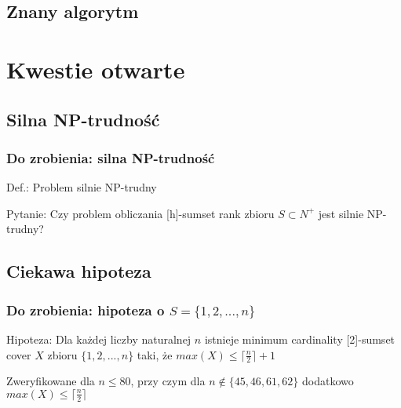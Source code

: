 \documentclass{beamer}
\begin{document}
	\subsection{Znany algorytm}
		\begin{frame}
		\end{frame}
		
\section{Kwestie otwarte}
	\subsection{Silna NP-trudność}
		\begin{frame} \frametitle{Do zrobienia: silna NP-trudność}
			Def.: Problem silnie NP-trudny
			
			Pytanie: Czy problem obliczania [h]-sumset rank zbioru $ S \subset N^{+} $ jest silnie NP-trudny?
		\end{frame}
		
	\subsection{Ciekawa hipoteza}
		\begin{frame} \frametitle{Do zrobienia: hipoteza o $ S = \lbrace 1,2,...,n \rbrace $}
			Hipoteza: Dla każdej liczby naturalnej $ n $ istnieje minimum cardinality [2]-sumset cover $ X $ zbioru $ \lbrace 1,2,...,n \rbrace $ taki, że $ max(X) \leq \lceil \frac{n}{2} \rceil + 1 $
			
			Zweryfikowane dla $ n \leq 80 $, przy czym dla $ n \notin \lbrace 45,46,61,62 \rbrace $ dodatkowo $ max(X) \leq \lceil \frac{n}{2} \rceil $
		\end{frame}
\end{document}
